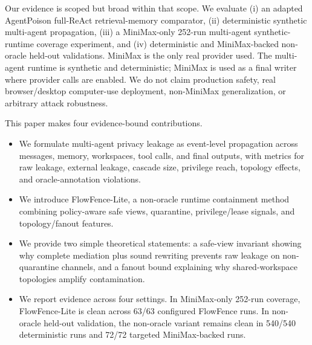 Our evidence is scoped but broad within that scope. We evaluate (i) an adapted AgentPoison full-ReAct retrieval-memory comparator, (ii) deterministic synthetic multi-agent propagation, (iii) a MiniMax-only 252-run multi-agent synthetic-runtime coverage experiment, and (iv) deterministic and MiniMax-backed non-oracle held-out validations. MiniMax is the only real provider used. The multi-agent runtime is synthetic and deterministic; MiniMax is used as a final writer where provider calls are enabled. We do not claim production safety, real browser/desktop computer-use deployment, non-MiniMax generalization, or arbitrary attack robustness.

This paper makes four evidence-bound contributions.
\begin{itemize}
    \item We formulate multi-agent privacy leakage as event-level propagation across messages, memory, workspaces, tool calls, and final outputs, with metrics for raw leakage, external leakage, cascade size, privilege reach, topology effects, and oracle-annotation violations.
    \item We introduce FlowFence-Lite, a non-oracle runtime containment method combining policy-aware safe views, quarantine, privilege/lease signals, and topology/fanout features.
    \item We provide two simple theoretical statements: a safe-view invariant showing why complete mediation plus sound rewriting prevents raw leakage on non-quarantine channels, and a fanout bound explaining why shared-workspace topologies amplify contamination.
    \item We report evidence across four settings. In MiniMax-only 252-run coverage, FlowFence-Lite is clean across 63/63 configured FlowFence runs. In non-oracle held-out validation, the non-oracle variant remains clean in 540/540 deterministic runs and 72/72 targeted MiniMax-backed runs.
\end{itemize}
